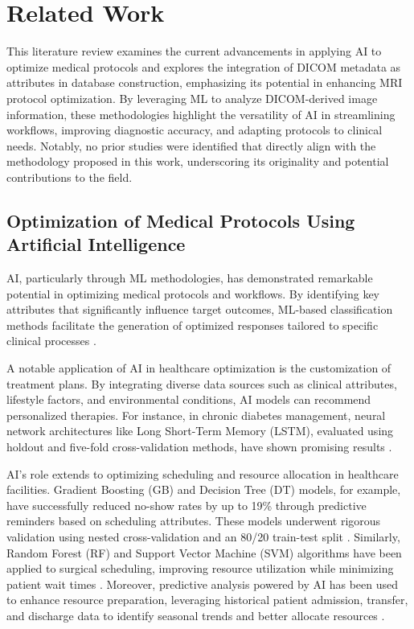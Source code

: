 \section{Related Work}
\label{sec:literature}

This literature review examines the current advancements in applying AI to optimize medical protocols and explores the integration of DICOM metadata as attributes in database construction, emphasizing its potential in enhancing MRI protocol optimization. By leveraging ML to analyze DICOM-derived image information, these methodologies highlight the versatility of AI in streamlining workflows, improving diagnostic accuracy, and adapting protocols to clinical needs. Notably, no prior studies were identified that directly align with the methodology proposed in this work, underscoring its originality and potential contributions to the field.

\subsection{Optimization of Medical Protocols Using Artificial Intelligence} \label{AIinOptMedical}

AI, particularly through ML methodologies, has demonstrated remarkable potential in optimizing medical protocols and workflows. By identifying key attributes that significantly influence target outcomes, ML-based classification methods facilitate the generation of optimized responses tailored to specific clinical processes \cite{reviewOptMedical}.

A notable application of AI in healthcare optimization is the customization of treatment plans. By integrating diverse data sources such as clinical attributes, lifestyle factors, and environmental conditions, AI models can recommend personalized therapies. For instance, in chronic diabetes management, neural network architectures like Long Short-Term Memory (LSTM), evaluated using holdout and five-fold cross-validation methods, have shown promising results \cite{diabetes}.

AI's role extends to optimizing scheduling and resource allocation in healthcare facilities. Gradient Boosting (GB) and Decision Tree (DT) models, for example, have successfully reduced no-show rates by up to 19\% through predictive reminders based on scheduling attributes. These models underwent rigorous validation using nested cross-validation and an 80/20 train-test split \cite{noShows}. Similarly, Random Forest (RF) and Support Vector Machine (SVM) algorithms have been applied to surgical scheduling, improving resource utilization while minimizing patient wait times \cite{reviewOptMedical, optSchedule}. Moreover, predictive analysis powered by AI has been used to enhance resource preparation, leveraging historical patient admission, transfer, and discharge data to identify seasonal trends and better allocate resources \cite{reviewOptMedical}.

